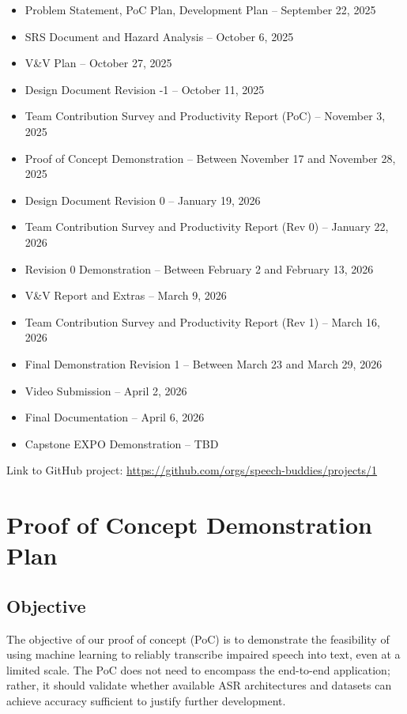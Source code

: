 \documentclass{article}
\begin{document}
\begin{itemize}
    \item Problem Statement, PoC Plan, Development Plan – September 22, 2025
    \item SRS Document and Hazard Analysis – October 6, 2025
    \item V\&V Plan – October 27, 2025
    \item Design Document Revision -1 – October 11, 2025
    \item Team Contribution Survey and Productivity Report (PoC) – November 3, 2025
    \item Proof of Concept Demonstration – Between November 17 and November 28, 2025
    \item Design Document Revision 0 – January 19, 2026
    \item Team Contribution Survey and Productivity Report (Rev 0) – January 22, 2026
    \item Revision 0 Demonstration – Between February 2 and February 13, 2026
    \item V\&V Report and Extras – March 9, 2026
    \item Team Contribution Survey and Productivity Report (Rev 1) – March 16, 2026
    \item Final Demonstration Revision 1 – Between March 23 and March 29, 2026
    \item Video Submission – April 2, 2026
    \item Final Documentation – April 6, 2026
    \item Capstone EXPO Demonstration – TBD
\end{itemize}

Link to GitHub project: \url{https://github.com/orgs/speech-buddies/projects/1}

\section{Proof of Concept Demonstration Plan}


\subsection{Objective}

The objective of our proof of concept (PoC) is to demonstrate the feasibility of using machine learning to reliably transcribe impaired speech into text, even at a limited scale. The PoC does not need to encompass the end-to-end application; rather, it should validate whether available ASR architectures and datasets can achieve accuracy sufficient to justify further development.
\end{document}
